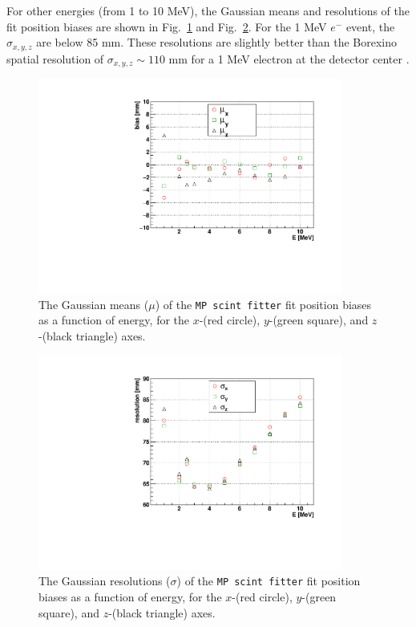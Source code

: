 For other energies (from 1 to 10 MeV), the Gaussian means and resolutions of the fit position biases are shown in Fig.~\ref{fig:scintBiasVsE} and Fig.~\ref{fig:scintResolVsE}. For the 1 MeV $e^-$ event, the $\sigma_{x,y,z}$ are below 85 mm. These resolutions are slightly better than the Borexino spatial resolution of $\sigma_{x,y,z} \sim 110$ mm for a 1 MeV electron at the detector center \cite{borexino2020experimental}.

\begin{figure}[!htb]
	\centering
	\includegraphics[width=10cm]{fullScintBiasVsE.pdf}
	\caption[The Gaussian means ($\mu$) of the \texttt{MP scint fitter} fit position biases as a function of energy.]{The Gaussian means ($\mu$) of the \texttt{MP scint fitter} fit position biases as a function of energy, for the $x$-(red circle), $y$-(green square), and $z$-(black triangle) axes.}
	\label{fig:scintBiasVsE}
\end{figure}

\begin{figure}[!htb]
	\centering
	\includegraphics[width=10cm]{fullScintResolVsE.pdf}
	\caption[The Gaussian resolutions ($\sigma$) of the \texttt{MP scint fitter} fit position biases as a function of energy.]{The Gaussian resolutions ($\sigma$) of the \texttt{MP scint fitter} fit position biases as a function of energy, for the $x$-(red circle), $y$-(green square), and $z$-(black triangle) axes.}
	\label{fig:scintResolVsE}
\end{figure}

